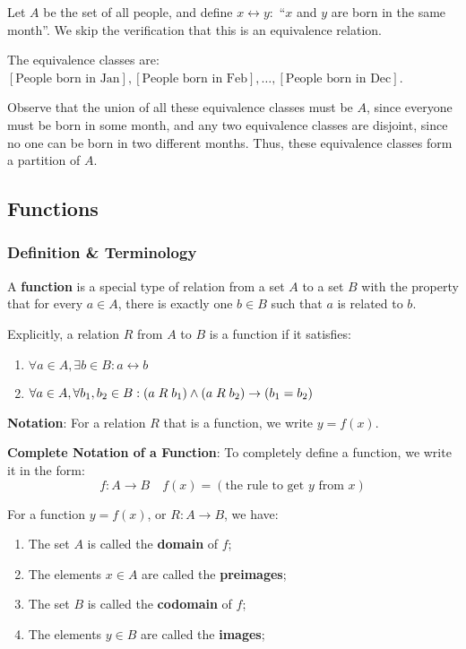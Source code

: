 \begin{example}
    Let $A$ be the set of all people, and define $x\rel y:$ ``$x$ and $y$ are born in the same
    month''.
    We skip the verification that this is an equivalence relation.
    
    The equivalence classes are: $[\text{People born in Jan}], [\text{People born in Feb}], \ldots,
    [\text{People born in Dec}]$.

    Observe that the union of all these equivalence classes must be $A$, since everyone must be born
    in some month, and any two equivalence classes are disjoint, since no one can be born in two different months.
    Thus, these equivalence classes form a partition of $A$.
\end{example}

\subsection{Functions}

\subsubsection{Definition \& Terminology}

\begin{definition}[Function]
    A \textbf{function} is a special type of relation from a set $A$ to a set $B$
    with the property that for every $a \in A$, there is exactly one $b \in B$
    such that $a$ is related to $b$.
    
    Explicitly, a relation $R$ from $A$ to $B$ is a function if it satisfies:
    \begin{enumerate}
        \item $\forall a\in A, \exists b\in B : a\rel b$
        \item $\forall a\in A, \forall b_1, b_2 \in B : (a\mathrel R b_1) \land (a\mathrel R b_2) \rightarrow (b_1 = b_2)$
    \end{enumerate}

    \textbf{Notation}: For a relation $R$ that is a function, we write $y=f(x)$.

    \textbf{Complete Notation of a Function}: To completely define a function, we write it in
    the form:
    \[
        f: A\to B \quad f(x) = (\text{the rule to get } y \text{ from } x)
    \]
\end{definition}

\begin{definition}
    For a function $y=f(x)$, or $R: A \to B$, we have:
    \begin{enumerate}
        \item The set $A$ is called the \textbf{domain} of $f$;
        \item The elements $x \in A$ are called the \textbf{preimages};
        \item The set $B$ is called the \textbf{codomain} of $f$;
        \item The elements $y \in B$ are called the \textbf{images};
    \end{enumerate}
\end{definition}

